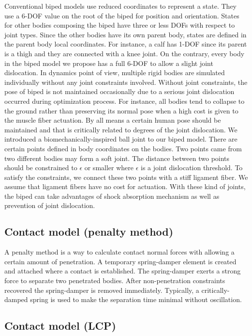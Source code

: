 \documentclass[a4paper,10pt]{article}
\begin{document}
Conventional biped models use reduced coordinates to represent a state.
They use a 6-DOF value on the root of the biped for position and orientation.
States for other bodies composing the biped have three or less DOFs with respect to joint types.
Since the other bodies have its own parent body, states are defined in the parent body local coordinates.
For instance, a calf has 1-DOF since its parent is a thigh and they are connected with a knee joint.
On the contrary, every body in the biped model we propose has a full 6-DOF to allow a slight joint dislocation.
In dynamics point of view, multiple rigid bodies are simulated individually without any joint constraints involved.
Without joint constraints, the pose of biped is not maintained occasionally due to a serious joint dislocation occurred during optimization process.
For instance, all bodies tend to collapse to the ground rather than preserving its normal pose when a high cost is given to the muscle fiber actuation.
By all means a certain human pose should be maintained and that is critically related to degrees of the joint dislocation.
We introduced a biomechanically-inspired ball joint to our biped model.
There are certain points defined in body coordinates on the bodies.
Two points came from two different bodies may form a soft joint.
The distance between two points should be constrained to $\epsilon$ or smaller where $\epsilon$ is a joint dislocation threshold.
To satisfy the constraints, we connect these two points with a stiff ligament fiber.
We assume that ligament fibers have no cost for actuation.
With these kind of joints, the biped can take advantages of shock absorption mechanism as well as prevention of joint dislocation.

\subsection{Contact model (penalty method)}
A penalty method is a way to calculate contact normal forces with allowing a certain amount of penetration.
A temporary spring-damper element is created and attached where a contact is established.
The spring-damper exerts a strong force to separate two penetrated bodies.
After non-penetration constraints recovered the spring-damper is removed immediately.
Typically, a critically-damped spring is used to make the separation time minimal without oscillation.


\subsection{Contact model (LCP)}
\end{document}
